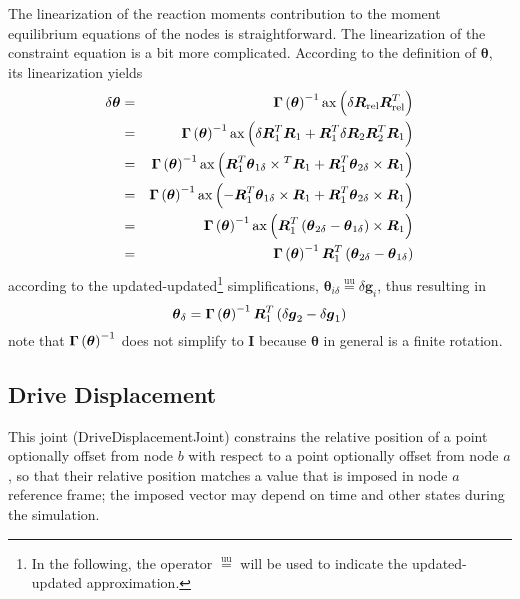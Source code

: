 \documentclass[10pt,dvips,fleqn]{report}
\newcommand{\T}[1]{\boldsymbol{#1}}
\newcommand{\equu}{\overset{\mathrm{uu}}{=}}
\begin{document}
The linearization of the reaction moments contribution 
to the moment equilibrium equations of the nodes is straightforward.
The linearization of the constraint equation is a bit more complicated.
According to the definition of $\T{\theta}$, its linearization
yields
\begin{eqnarray*}
	\delta\T{\theta}
		& = & \T{\Gamma}\plbr{\T{\theta}}^{-1} 
			\llk{ax}\plbr{\delta\T{R}_{\text{rel}} \T{R}_{\text{rel}}^T} \\
		& = & \T{\Gamma}\plbr{\T{\theta}}^{-1} \llk{ax}\plbr{
			\delta\T{R}_1^T \T{R}_1
			+ \T{R}_1^T \delta\T{R}_2 \T{R}_2^T \T{R}_1
		} \\
		& = & \T{\Gamma}\plbr{\T{\theta}}^{-1} \llk{ax}\plbr{
			\T{R}_1^T \T{\theta}_{1\delta}\times{}^T \T{R}_1
			+ \T{R}_1^T \T{\theta}_{2\delta}\times{} \T{R}_1
		} \\
		& = & \T{\Gamma}\plbr{\T{\theta}}^{-1} \llk{ax}\plbr{
			- \T{R}_1^T \T{\theta}_{1\delta}\times{} \T{R}_1
			+ \T{R}_1^T \T{\theta}_{2\delta}\times{} \T{R}_1
		} \\
		& = & \T{\Gamma}\plbr{\T{\theta}}^{-1}
			\llk{ax} \plbr{
				\T{R}_1^T \plbr{
					\T{\theta}_{2\delta}
					- \T{\theta}_{1\delta}
				}\times \T{R}_1
			} \\
		& = & \T{\Gamma}\plbr{\T{\theta}}^{-1} \T{R}_1^T \plbr{
			\T{\theta}_{2\delta} - \T{\theta}_{1\delta}
		}
\end{eqnarray*}
according to the updated-updated\footnote{In the following, 
the operator $\equu$ will be used to indicate the updated-updated
approximation.} simplifications,
$\T{\theta}_{i\delta}\equu\delta\T{g}_i$, thus resulting in
\begin{equation}
	\T{\theta}_{\delta} = \T{\Gamma}\plbr{\T{\theta}}^{-1} \T{R}_1^T \plbr{
		\delta\T{g}_2 - \delta\T{g}_1
	}
	\label{eq:DRIVE-HINGE-theta-delta}
\end{equation}
note that $\T{\Gamma}\plbr{\T{\theta}}^{-1}$ does not simplify to $\T{I}$
because $\T{\theta}$ in general is a finite rotation.



\subsection{Drive Displacement}
\label{sec:DriveDisplacementJoint}
This joint (DriveDisplacementJoint) constrains the relative position
of a point optionally offset from node $b$ with respect to a point
optionally offset from node $a$, so that their relative position matches
a value that is imposed in node $a$ reference frame; the imposed vector
may depend on time and other states during the simulation.
\end{document}
